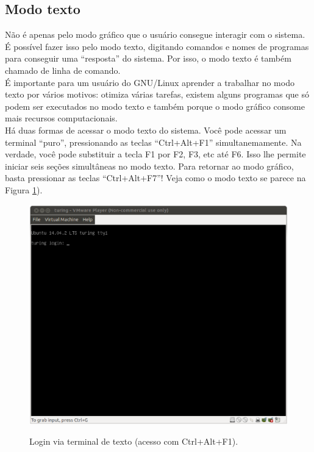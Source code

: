 \begin{refsection}
\section{Modo texto}\label{tut1:text_mode}
 Não é apenas pelo modo gráfico que o usuário consegue interagir com o sistema. É possível fazer isso pelo modo texto, digitando comandos e nomes de programas para conseguir uma ``resposta'' do sistema. Por isso, o modo texto é também chamado de linha de comando.\\
É importante para um usuário do GNU/Linux aprender a trabalhar no modo texto por vários motivos: otimiza várias tarefas, existem alguns programas que só podem ser executados no modo texto e também porque o modo gráfico consome mais recursos computacionais.\\
Há duas formas de acessar o modo texto do sistema. Você pode acessar um terminal ``puro'', pressionando as teclas ``Ctrl+Alt+F1'' simultanemamente. Na verdade, você pode substituir a tecla F1 por F2, F3, etc até F6. Isso lhe permite iniciar seis seções simultâneas no modo texto. Para retornar ao modo gráfico, basta pressionar as teclas ``Ctrl+Alt+F7''! Veja como o modo texto se parece na Figura \ref{tut1:fig:terminal0}).\\

  \begin{figure}[H]
       \centering
      {\includegraphics[scale=0.35]{figures/tut1/terminal0.eps}}
      {\caption[\textit{Acesso ao terminal via Ctrl+Alt+F1}]{Login via terminal de texto (acesso com Ctrl+Alt+F1).}\label{tut1:fig:terminal0}}
  \end{figure}


\end{refsection}
